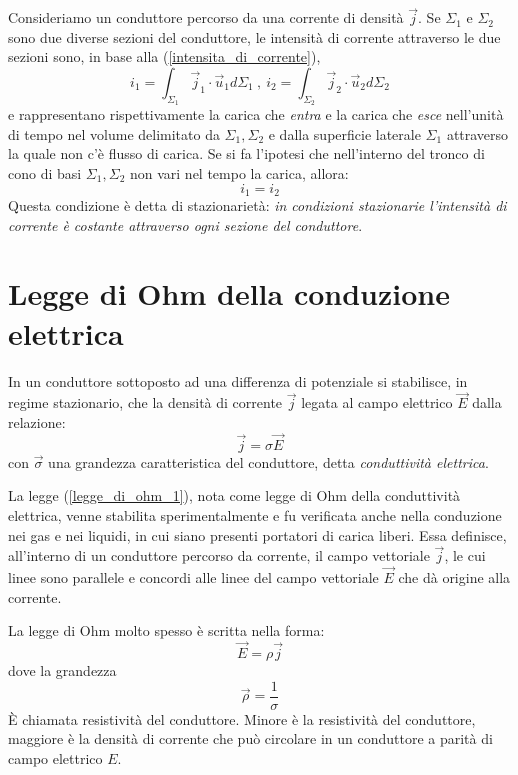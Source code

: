 \documentclass[class=book, crop=false, oneside, 12pt]{standalone}
\begin{document}
Consideriamo un conduttore percorso da una corrente di densità \(\overrightarrow{j}\). 
Se \(\Sigma_1\) e \(\Sigma_2\) sono due diverse sezioni del conduttore, le intensità di corrente attraverso le due sezioni sono, in base alla (\ref{intensita_di_corrente}),
\begin{equation*}
    i_1 = \int_{\Sigma_1} \overrightarrow{j}_1 \cdot \overrightarrow{u}_1 d \Sigma_1 \ , \ i_2 = \int_{\Sigma_2} \overrightarrow{j}_2 \cdot \overrightarrow{u}_2 d \Sigma_2
\end{equation*}
e rappresentano rispettivamente la carica che \emph{entra} e la carica che \emph{esce} nell'unità di tempo nel volume delimitato da \(\Sigma_1, \Sigma_2\) e dalla superficie laterale \(\Sigma_1\) attraverso la quale non c'è flusso di carica. 
Se si fa l'ipotesi che nell'interno del tronco di cono di basi \(\Sigma_1, \Sigma_2\) non vari nel tempo la carica, allora: 
\begin{equation}
    i_1 = i_2
\end{equation}
Questa condizione è detta di stazionarietà: \emph{in condizioni stazionarie l'intensità di corrente è costante attraverso ogni sezione del conduttore}. 

\section{Legge di Ohm della conduzione elettrica}

In un conduttore sottoposto ad una differenza di potenziale si stabilisce, in regime stazionario, che la densità di corrente \(\overrightarrow{j}\) legata al campo elettrico \(\overrightarrow{E}\) dalla relazione: 
\begin{equation} \label{legge_di_ohm_1}
    \overrightarrow{j} = \sigma \overrightarrow{E}
\end{equation}
con \(\overrightarrow{\sigma}\) una grandezza caratteristica del conduttore, detta \emph{conduttività elettrica}. 

La legge (\ref{legge_di_ohm_1}), nota come legge di Ohm della conduttività elettrica, venne stabilita sperimentalmente e fu verificata anche nella conduzione nei gas e nei liquidi, in cui siano presenti portatori di carica liberi. 
Essa definisce, all'interno di un conduttore percorso da corrente, il campo vettoriale \(\overrightarrow{j}\), le cui linee sono parallele e concordi alle linee del campo vettoriale \(\overrightarrow{E}\) che dà origine alla corrente. 

La legge di Ohm molto spesso è scritta nella forma:
\begin{equation}
    \overrightarrow{E} = \rho \overrightarrow{j}
\end{equation} 
dove la grandezza
\begin{equation}
    \overrightarrow{\rho} = \frac{1}{\sigma}
\end{equation}
È chiamata resistività del conduttore. 
Minore è la resistività del conduttore, maggiore è la densità di corrente che può circolare in un conduttore a parità di campo elettrico \(E\).
\end{document}
